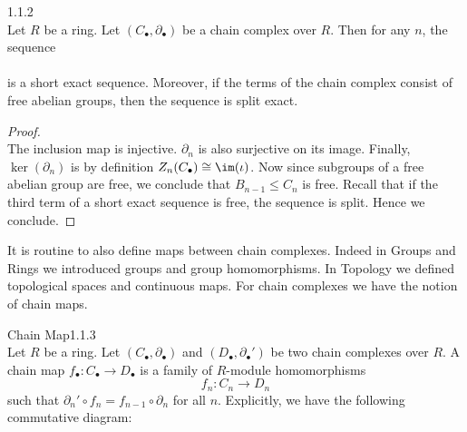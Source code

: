 \documentclass[a4paper]{article}
\begin{document}
\begin{lmm}{}{1.1.2}\\
Let $R$ be a ring. Let $(C_\bullet,\partial_\bullet)$ be a chain complex over $R$. Then for any $n$, the sequence \\
\\
is a short exact sequence. Moreover, if the terms of the chain complex consist of free abelian groups, then the sequence is split exact. 
\begin{proof}\\
The inclusion map is injective. $\partial_n$ is also surjective on its image. Finally, $\ker(\partial_n)$ is by definition $Z_n(C_\bullet)\cong\im(\iota)$. Now since subgroups of a free abelian group are free, we conclude that $B_{n-1}\leq C_n$ is free. Recall that if the third term of a short exact sequence is free, the sequence is split. Hence we conclude. 
\end{proof}
\end{lmm}

It is routine to also define maps between chain complexes. Indeed in Groups and Rings we introduced groups and group homomorphisms. In Topology we defined topological spaces and continuous maps. For chain complexes we have the notion of chain maps. 

\begin{defn}{Chain Map}{1.1.3}\\
Let $R$ be a ring. Let $(C_\bullet,\partial_\bullet)$ and $(D_\bullet,\partial_\bullet')$ be two chain complexes over $R$. A chain map $f_\bullet:C_\bullet\to D_\bullet$ is a family of $R$-module homomorphisms $$f_n:C_n\to D_n$$ such that $\partial_n'\circ f_n=f_{n-1}\circ\partial_n$ for all $n$. Explicitly, we have the following commutative diagram: \\
\end{defn}
\end{document}
